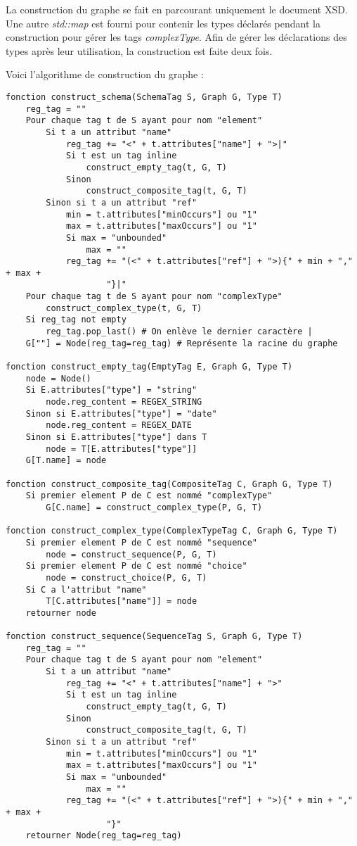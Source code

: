 \documentclass[10pt, a4paper]{article}
\begin{document}
La construction du graphe se fait en parcourant uniquement le document
XSD. Une autre \emph{std::map} est fourni pour contenir les types
déclarés pendant la construction pour gérer les tags \emph{complexType}.
Afin de gérer les déclarations des types après leur utilisation, la
construction est faite deux fois.

Voici l'algorithme de construction du graphe :

\begin{verbatim}
fonction construct_schema(SchemaTag S, Graph G, Type T)
    reg_tag = ""
    Pour chaque tag t de S ayant pour nom "element"
        Si t a un attribut "name"
            reg_tag += "<" + t.attributes["name"] + ">|"
            Si t est un tag inline
                construct_empty_tag(t, G, T)
            Sinon
                construct_composite_tag(t, G, T)
        Sinon si t a un attribut "ref"
            min = t.attributes["minOccurs"] ou "1"
            max = t.attributes["maxOccurs"] ou "1"
            Si max = "unbounded"
                max = ""
            reg_tag += "(<" + t.attributes["ref"] + ">){" + min + "," + max +
                    "}|"
    Pour chaque tag t de S ayant pour nom "complexType"
        construct_complex_type(t, G, T)
    Si reg_tag not empty
        reg_tag.pop_last() # On enlève le dernier caractère |
    G[""] = Node(reg_tag=reg_tag) # Représente la racine du graphe

fonction construct_empty_tag(EmptyTag E, Graph G, Type T)
    node = Node()
    Si E.attributes["type"] = "string"
        node.reg_content = REGEX_STRING
    Sinon si E.attributes["type"] = "date"
        node.reg_content = REGEX_DATE
    Sinon si E.attributes["type"] dans T
        node = T[E.attributes["type"]]
    G[T.name] = node

fonction construct_composite_tag(CompositeTag C, Graph G, Type T)
    Si premier element P de C est nommé "complexType"
        G[C.name] = construct_complex_type(P, G, T)

fonction construct_complex_type(ComplexTypeTag C, Graph G, Type T)
    Si premier element P de C est nommé "sequence"
        node = construct_sequence(P, G, T)
    Si premier element P de C est nommé "choice"
        node = construct_choice(P, G, T)
    Si C a l'attribut "name"
        T[C.attributes["name"]] = node
    retourner node

fonction construct_sequence(SequenceTag S, Graph G, Type T)
    reg_tag = ""
    Pour chaque tag t de S ayant pour nom "element"
        Si t a un attribut "name"
            reg_tag += "<" + t.attributes["name"] + ">"
            Si t est un tag inline
                construct_empty_tag(t, G, T)
            Sinon
                construct_composite_tag(t, G, T)
        Sinon si t a un attribut "ref"
            min = t.attributes["minOccurs"] ou "1"
            max = t.attributes["maxOccurs"] ou "1"
            Si max = "unbounded"
                max = ""
            reg_tag += "(<" + t.attributes["ref"] + ">){" + min + "," + max +
                    "}"
    retourner Node(reg_tag=reg_tag)


\end{verbatim}
\end{document}

